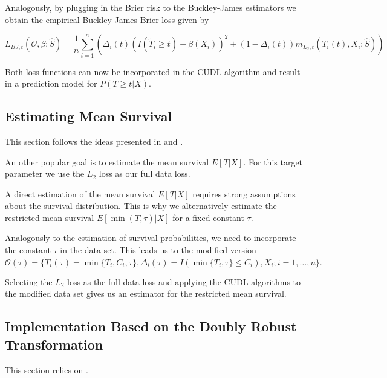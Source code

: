 \documentclass[12pt, a4paper]{article}
\theoremstyle{definition}
\theoremstyle{plain}
\numberwithin{equation}{section}
\numberwithin{figure}{section}
\numberwithin{table}{section}
\begin{document}
	Analogously, by plugging in the Brier risk to the Buckley-James estimators we obtain the empirical Buckley-James Brier loss given by
	
	\begin{equation*}
		L_{BJ,t}(\mathcal{O},\beta; \hat{S}) = \frac{1}{n} \sum_{i=1}^n \left( \Delta_i(t)(I(\tilde{T}_i\geq t)-\beta(X_i))^2 + (1- \Delta_i(t))m_{L_2,t}(\tilde{T}_i(t), X_i; \hat{S})\right)
	\end{equation*}
	
	Both loss functions can now be incorporated in the CUDL algorithm and result in a prediction model for $P(T\geq t\vert X)$.

	\subsection{Estimating Mean Survival}
	
	This section follows the ideas presented in \citet*{basearticle} and \citet*{strawderman}.
	
	An other popular goal is to estimate the mean survival $E[T\vert X]$.
	For this target parameter we use the $L_2$ loss as our full data loss.
	
	A direct estimation of the mean survival $E[T\vert X]$ requires strong assumptions about the survival distribution.
	This is why we alternatively estimate the restricted mean survival $E[\min(T, \tau)\vert X]$ for a fixed constant $\tau$.
	
	Analogously to the estimation of survival probabilities, we need to incorporate the constant $\tau$ in the data set.
	This leads us to the modified version	
	\begin{equation*}
		\mathcal{O}(\tau) = \{\tilde{T}_i(\tau) = \min\{T_i, C_i, \tau\}, \Delta_i(\tau) = I(\min\{T_i, \tau\}\leq C_i), X_i; i = 1, \dots , n\}.
	\end{equation*}
	
	Selecting the $L_2$ loss as the full data loss and applying the CUDL algorithms to the modified data set gives us an estimator for the restricted mean survival.
	
	\subsection{Implementation Based on the Doubly Robust Transformation}
	
	This section relies on \citet*{basearticle}.
	
\end{document}
